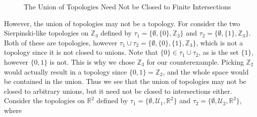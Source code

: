     \begin{figure}[H]
        \centering
        \captionsetup{type=figure}
        \caption{The Union of Topologies Need Not be Closed
                 to Finite Intersections}
        \label{fig:Union_of_Topologies_Not_Closed_to_Intersections}
    \end{figure}
    However, the union of topologies may not be a topology. For consider the two
    Sierpinski-like topologies on $\mathbb{Z}_{3}$ defined by
    $\tau_{1}=\{\emptyset,\{0\},\mathbb{Z}_{3}\}$ and
    $\tau_{2}=\{\emptyset,\{1\},\mathbb{Z}_{3}\}$. Both of these are topologies,
    however $\tau_{1}\cup\tau_{2}=\{\emptyset,\{0\},\{1\},\mathbb{Z}_{3}\}$,
    which is not a topology since it is not closed to unions. Note that
    $\{0\}\in\tau_{1}\cup\tau_{2}$, as is the set $\{1\}$, however $\{0,1\}$ is
    not. This is why we chose $\mathbb{Z}_{3}$ for our counterexample. Picking
    $\mathbb{Z}_{2}$ would actually result in a topology since
    $\{0,1\}=\mathbb{Z}_{2}$, and the whole space would be contained in the
    union. Thus we see that the union of topologies may not be closed to
    arbitrary unions, but it need not be closed to intersections either.
    Consider the topologies on $\mathbb{R}^{2}$ defined by
    $\tau_{1}=\{\emptyset,\mathcal{U}_{1},\mathbb{R}^{2}\}$ and
    $\tau_{2}=\{\emptyset,\mathcal{U}_{2},\mathbb{R}^{2}\}$, where
